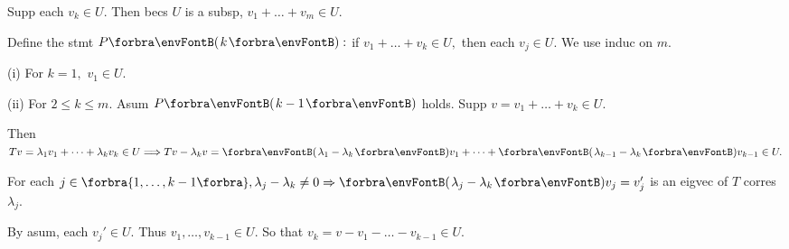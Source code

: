 \SepLine

\par\quad
Supp each $v_k\in U.$ Then becs $U$ is a subsp, $v_1+\dots+v_m\in U.$\par\quad
Define the stmt $P\Par{k}:$ if $v_1+\dots+v_k\in U,$ then each $v_j\in U.$ We use induc on $m.$\par\quad
(i) For $k=1,$ $v_1\in U.$\par\quad\Endi
(ii) For $2\leqslant k\leqslant m.$ Asum $P\Par{k-1}$ holds. Supp $v=v_1+\dots+v_k\in U.$\par\quad\Hii
Then $Tv=\lambda_1v_1+\dots+\lambda_k v_k\in U\Longrightarrow Tv-\lambda_k v=\Par{\lambda_1-\lambda_k}v_1+\dots+\Par{\lambda_{k-1}-\lambda_k}v_{k-1}\in U.$\par\quad\Hii
For each $j\in\Bra{1,\dots,k-1},\lambda_j-\lambda_{k}\neq 0\Rightarrow\Par{\lambda_j-\lambda_k}v_j=v_j'$ is an eigvec of $T$ corres $\lambda_j.$\par\quad\Hii
By asum, each $v_j'\in U.$ Thus $v_1,\dots,v_{k-1}\in U.$ So that $v_k=v-v_1-\dots-v_{k-1}\in U.$\PfEnd
\SepLine[0pt][\Blind{\BulletPointX} ]

